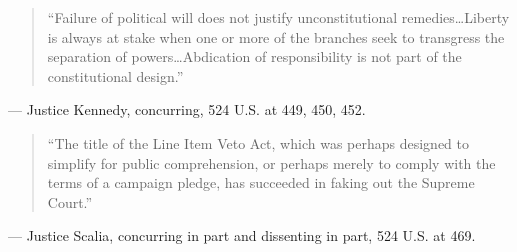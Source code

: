 \documentclass[12pt]{article}
\begin{document}
\begin{quote}
``Failure of political will does not justify unconstitutional remedies\ldots Liberty is always at stake when one or more of the branches seek to transgress the separation of powers\ldots Abdication of responsibility is not part of the constitutional design.''
\end{quote}
\noindent --- Justice Kennedy, concurring, 524 U.S. at 449, 450, 452.

\begin{quote}
``The title of the Line Item Veto Act, which was perhaps designed to simplify for public comprehension, or perhaps merely to comply with the terms of a campaign pledge, has succeeded in faking out the Supreme Court.''
\end{quote}
\noindent --- Justice Scalia, concurring in part and dissenting in part, 524 U.S. at 469.
\end{document}
